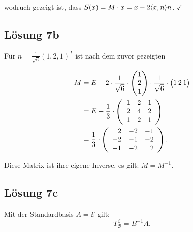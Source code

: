 \documentclass[main.tex]{subfiles}
\begin{document}
wodruch gezeigt ist, dass $S(x) = M\cdot x = x-2 \langle x,n\rangle n$. $\checkmark$


\subsection*{Lösung 7b}

Für $n = \frac{1}{\sqrt{6}} (1, 2, 1)^T$ ist nach dem zuvor gezeigten

\begin{align*}
    M &= E -2 \cdot \frac{1}{\sqrt{6}}\cdot \vektor{1 \\ 2 \\ 1} \cdot \frac{1}{\sqrt{6}}\cdot \vektor{1 & 2 & 1} \\
      &= E - \frac{1}{3} \cdot \eqmatrix{rrr}{
        1 & 2 & 1 \\
        2 & 4 & 2 \\
        1 & 2 & 1} \\
      &= \frac{1}{3} \cdot \eqmatrix{rrr}{
        2 & -2 & -1 \\
        -2 & -1 & -2 \\
        -1 & -2 & 2}.
\end{align*}

Diese Matrix ist ihre eigene Inverse, es gilt: $M = M^{-1}$.


\subsection*{Lösung 7c}
Mit der Standardbasis $A = \mathcal{E}$ gilt:
$$
    T^{\mathcal{E}}_{\mathcal{B}} = B^{-1} A.
$$
\end{document}
